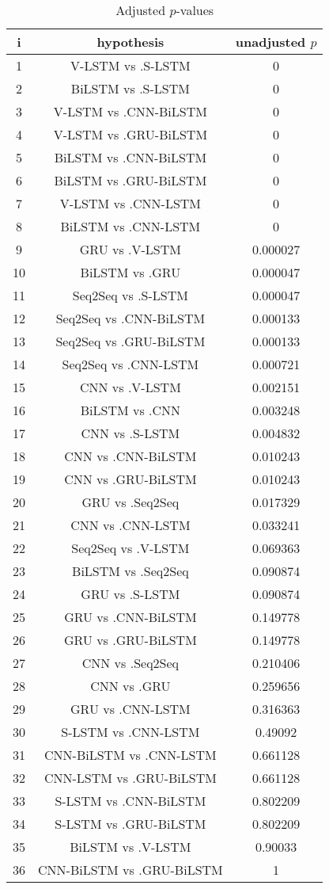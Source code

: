 \documentclass[a4paper,10pt]{article}
\begin{document}
\begin{landscape}
\begin{table}[!htp]
\centering\scriptsize
\begin{tabular}{ccc}
i&hypothesis&unadjusted $p$\\
\hline1&V-LSTM vs .S-LSTM&0\\
2&BiLSTM vs .S-LSTM&0\\
3&V-LSTM vs .CNN-BiLSTM&0\\
4&V-LSTM vs .GRU-BiLSTM&0\\
5&BiLSTM vs .CNN-BiLSTM&0\\
6&BiLSTM vs .GRU-BiLSTM&0\\
7&V-LSTM vs .CNN-LSTM&0\\
8&BiLSTM vs .CNN-LSTM&0\\
9&GRU vs .V-LSTM&0.000027\\
10&BiLSTM vs .GRU&0.000047\\
11&Seq2Seq vs .S-LSTM&0.000047\\
12&Seq2Seq vs .CNN-BiLSTM&0.000133\\
13&Seq2Seq vs .GRU-BiLSTM&0.000133\\
14&Seq2Seq vs .CNN-LSTM&0.000721\\
15&CNN vs .V-LSTM&0.002151\\
16&BiLSTM vs .CNN&0.003248\\
17&CNN vs .S-LSTM&0.004832\\
18&CNN vs .CNN-BiLSTM&0.010243\\
19&CNN vs .GRU-BiLSTM&0.010243\\
20&GRU vs .Seq2Seq&0.017329\\
21&CNN vs .CNN-LSTM&0.033241\\
22&Seq2Seq vs .V-LSTM&0.069363\\
23&BiLSTM vs .Seq2Seq&0.090874\\
24&GRU vs .S-LSTM&0.090874\\
25&GRU vs .CNN-BiLSTM&0.149778\\
26&GRU vs .GRU-BiLSTM&0.149778\\
27&CNN vs .Seq2Seq&0.210406\\
28&CNN vs .GRU&0.259656\\
29&GRU vs .CNN-LSTM&0.316363\\
30&S-LSTM vs .CNN-LSTM&0.49092\\
31&CNN-BiLSTM vs .CNN-LSTM&0.661128\\
32&CNN-LSTM vs .GRU-BiLSTM&0.661128\\
33&S-LSTM vs .CNN-BiLSTM&0.802209\\
34&S-LSTM vs .GRU-BiLSTM&0.802209\\
35&BiLSTM vs .V-LSTM&0.90033\\
36&CNN-BiLSTM vs .GRU-BiLSTM&1\\
\hline
\end{tabular}
\caption{Adjusted $p$-values}
\end{table}

\end{landscape}
\end{document}
